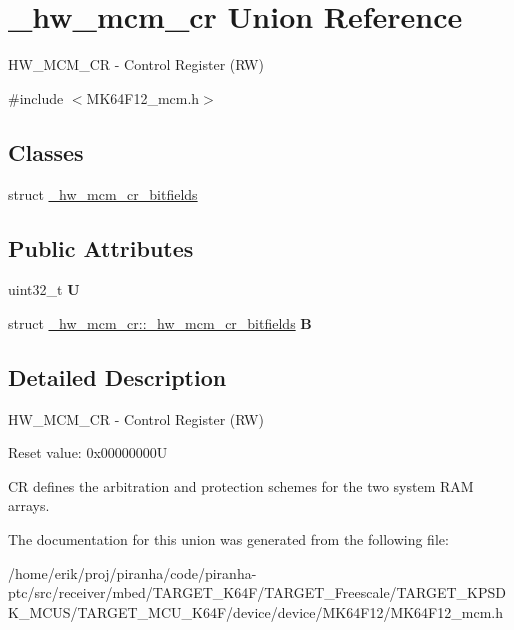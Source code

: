 \hypertarget{union__hw__mcm__cr}{}\section{\+\_\+hw\+\_\+mcm\+\_\+cr Union Reference}
\label{union__hw__mcm__cr}


H\+W\+\_\+\+M\+C\+M\+\_\+\+CR -\/ Control Register (RW)  




{\ttfamily \#include $<$M\+K64\+F12\+\_\+mcm.\+h$>$}

\subsection*{Classes}
\begin{DoxyCompactItemize}
\item 
struct \hyperlink{struct__hw__mcm__cr_1_1__hw__mcm__cr__bitfields}{\+\_\+hw\+\_\+mcm\+\_\+cr\+\_\+bitfields}
\end{DoxyCompactItemize}
\subsection*{Public Attributes}
\begin{DoxyCompactItemize}
\item 
uint32\+\_\+t {\bfseries U}\hypertarget{union__hw__mcm__cr_abd31d76af42da38fb5306bad0650008d}{}\label{union__hw__mcm__cr_abd31d76af42da38fb5306bad0650008d}

\item 
struct \hyperlink{struct__hw__mcm__cr_1_1__hw__mcm__cr__bitfields}{\+\_\+hw\+\_\+mcm\+\_\+cr\+::\+\_\+hw\+\_\+mcm\+\_\+cr\+\_\+bitfields} {\bfseries B}\hypertarget{union__hw__mcm__cr_ab91fc820492416330b410590a0643d19}{}\label{union__hw__mcm__cr_ab91fc820492416330b410590a0643d19}

\end{DoxyCompactItemize}


\subsection{Detailed Description}
H\+W\+\_\+\+M\+C\+M\+\_\+\+CR -\/ Control Register (RW) 

Reset value\+: 0x00000000U

CR defines the arbitration and protection schemes for the two system R\+AM arrays. 

The documentation for this union was generated from the following file\+:\begin{DoxyCompactItemize}
\item 
/home/erik/proj/piranha/code/piranha-\/ptc/src/receiver/mbed/\+T\+A\+R\+G\+E\+T\+\_\+\+K64\+F/\+T\+A\+R\+G\+E\+T\+\_\+\+Freescale/\+T\+A\+R\+G\+E\+T\+\_\+\+K\+P\+S\+D\+K\+\_\+\+M\+C\+U\+S/\+T\+A\+R\+G\+E\+T\+\_\+\+M\+C\+U\+\_\+\+K64\+F/device/device/\+M\+K64\+F12/M\+K64\+F12\+\_\+mcm.\+h\end{DoxyCompactItemize}
